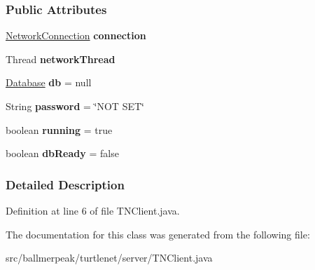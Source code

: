 \subsubsection*{Public Attributes}
\begin{DoxyCompactItemize}
\item 
\hypertarget{classballmerpeak_1_1turtlenet_1_1server_1_1TNClient_a5f3a2db779658358496e57ddc06ca612}{\hyperlink{classballmerpeak_1_1turtlenet_1_1server_1_1NetworkConnection}{Network\-Connection} {\bfseries connection}}\label{classballmerpeak_1_1turtlenet_1_1server_1_1TNClient_a5f3a2db779658358496e57ddc06ca612}

\item 
\hypertarget{classballmerpeak_1_1turtlenet_1_1server_1_1TNClient_a30362e2dd295df5ecaadc7fed3374ea0}{Thread {\bfseries network\-Thread}}\label{classballmerpeak_1_1turtlenet_1_1server_1_1TNClient_a30362e2dd295df5ecaadc7fed3374ea0}

\item 
\hypertarget{classballmerpeak_1_1turtlenet_1_1server_1_1TNClient_a71515570b30a73fbd91017c811dad2ba}{\hyperlink{classballmerpeak_1_1turtlenet_1_1server_1_1Database}{Database} {\bfseries db} = null}\label{classballmerpeak_1_1turtlenet_1_1server_1_1TNClient_a71515570b30a73fbd91017c811dad2ba}

\item 
\hypertarget{classballmerpeak_1_1turtlenet_1_1server_1_1TNClient_a9307f6efc05ddda37f9355b6f13953d9}{String {\bfseries password} = \char`\"{}N\-O\-T S\-E\-T\char`\"{}}\label{classballmerpeak_1_1turtlenet_1_1server_1_1TNClient_a9307f6efc05ddda37f9355b6f13953d9}

\item 
\hypertarget{classballmerpeak_1_1turtlenet_1_1server_1_1TNClient_af8bbdf5ff58fedc8c99ef82b17654a94}{boolean {\bfseries running} = true}\label{classballmerpeak_1_1turtlenet_1_1server_1_1TNClient_af8bbdf5ff58fedc8c99ef82b17654a94}

\item 
\hypertarget{classballmerpeak_1_1turtlenet_1_1server_1_1TNClient_aec7ed1884c5ebaaff15d83de15086ef2}{boolean {\bfseries db\-Ready} = false}\label{classballmerpeak_1_1turtlenet_1_1server_1_1TNClient_aec7ed1884c5ebaaff15d83de15086ef2}

\end{DoxyCompactItemize}


\subsubsection{Detailed Description}


Definition at line 6 of file T\-N\-Client.\-java.



The documentation for this class was generated from the following file\-:\begin{DoxyCompactItemize}
\item 
src/ballmerpeak/turtlenet/server/T\-N\-Client.\-java\end{DoxyCompactItemize}
